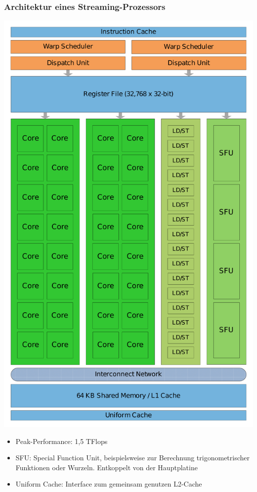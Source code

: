 \subsubsection{Architektur eines Streaming-Prozessors}
\includegraphics[scale=0.2]{mikroprozessoren2/Nvidia-Fermi.pdf}

\begin{itemize}
	\item Peak-Performance: 1,5 TFlops
	\item SFU: Special Function Unit, beispielsweise zur Berechnung trigonometrischer Funktionen oder Wurzeln. Entkoppelt von der Hauptplatine
	\item Uniform Cache: Interface zum gemeinsam genutzen L2-Cache
\end{itemize}


